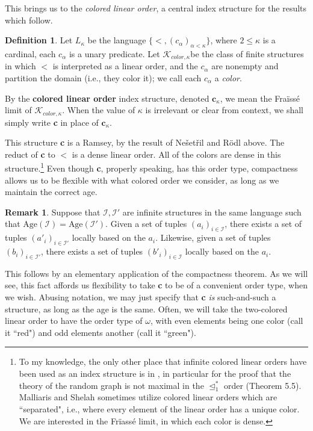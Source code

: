 \documentclass{article}
\newcommand{\calI}{\mathcal{I}}
\newcommand{\calK}{\mathcal{K}}
\newcommand{\Age}{\text{Age}}
\theoremstyle{definition}
\newtheorem{definition}{Definition}
\theoremstyle{definition}
\newtheorem{remark}{Remark}
\theoremstyle{definition}
\theoremstyle{definition}
\begin{document}
This brings us to the \textit{colored linear order}, a central index structure for the results which follow.

\begin{definition}{}\label{colored linear order}
Let $L_\kappa$  be the language $\{<, (c_\alpha)_{\alpha<\kappa}\}$, where $2\leq \kappa$ is a cardinal, each $c_\alpha$ is a unary predicate. Let $\calK_{color,\kappa}$be the class of finite structures in which $<$ is interpreted as a linear order, and the $c_\alpha$ are nonempty and partition the domain (i.e., they color it); we call each $c_\alpha$ a \textit{color}.

By the \textbf{colored linear order} index structure, denoted $\textbf{c}_\kappa$, we mean the Fra\"iss\'e limit of $\calK_{color,\kappa}$. When the value of $\kappa$ is irrelevant or clear from context, we shall simply write \textbf{c} in place of $\textbf{c}_\kappa$.
\end{definition}

This structure \textbf{c} is a Ramsey, by the result of Ne\v set\v ril and R\"odl above. The reduct of \textbf{c} to $<$ is a dense linear order. All of the colors are dense in this structure.\footnote{To my knowledge, the only other place that infinite colored linear orders have been used as an index structure is in \cite{MALLIARIS_Shelah_2019}, in particular for the proof that the theory of the random graph is not maximal in the $\trianglelefteq^*_1$ order (Theorem 5.5). Malliaris and Shelah sometimes utilize colored linear orders which are ``separated", i.e., where every element of the linear order has  a unique color. We are interested in the Fr\"iass\'e limit, in which each color is dense.} Even though \textbf{c}, properly speaking, has this order type, compactness allows us to be flexible with what colored order we consider, as long as we maintain the correct age.

\begin{remark}\label{changing order type}{}
Suppose that $\calI,\calI'$ are infinite structures in the same language such that $\Age(\calI)=\Age(\calI')$. Given a set of tuples $(a_i)_{i\in\calI}$, there exists a set of tuples $(a'_i)_{i\in\calI'}$ locally based on the $a_i$. Likewise, given a set of tuples $(b_i)_{i\in\calI'}$, there exists a set of tuples $(b'_i)_{i\in\calI}$ locally based on the $a_i$.
    
\end{remark}

This follows by an elementary application of the compactness theorem. As we will see, this fact affords us flexibility to take \textbf{c} to be of a convenient order type, when we wish. Abusing notation, we may just specify that \textbf{c} \textit{is} such-and-such a structure, as long as the age is the same. Often, we will take  the two-colored linear order to have the order type of $\omega$, with even elements being one color (call it ``red") and odd elements another (call it ``green").
\end{document}
